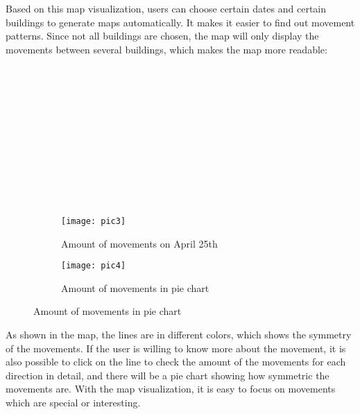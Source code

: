 Based on this map visualization, users can choose certain dates and certain buildings to generate maps automatically. It makes it easier to find out movement patterns. Since not all buildings are chosen, the map will only display the movements between several buildings, which makes the map more readable:
\\\\
\\\\
\\\\
\\\\
\\\\
\\\\

\begin{figure}[H]
	\centering
	\captionsetup[subfigure]{justification=centering}
	\begin{subfigure}[t]{0.48\textwidth}
	\texttt{[image: pic3]}
	\caption{Amount of movements on April 25th}
	\end{subfigure}
	\begin{subfigure}[t]{0.48\textwidth}
	\texttt{[image: pic4]}
	\caption{Amount of movements in pie chart}
	\end{subfigure}
\end{figure}

As shown in the map, the lines are in different colors, which shows the symmetry of the movements. If the user is willing to know more about the movement, it is also possible to click on the line to check the amount of the movements for each direction in detail, and there will be a pie chart showing how symmetric the movements are. With the map visualization, it is easy to focus on movements which are special or interesting.

